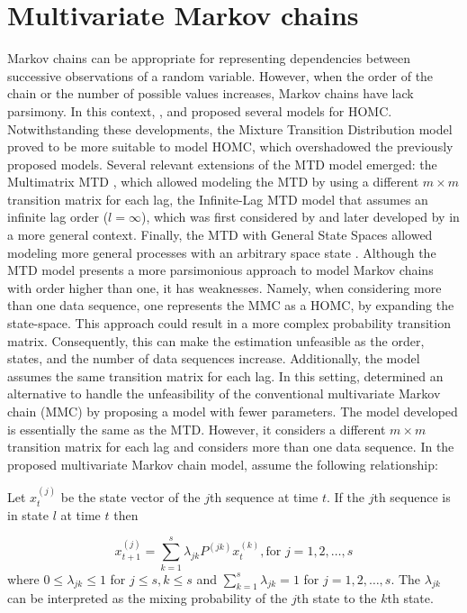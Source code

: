 \section{Multivariate Markov chains}\label{multivariate-markov-chains}

Markov chains can be appropriate for representing dependencies between successive observations of a random variable. However, when the order of the chain or the number of possible values increases, Markov chains have lack parsimony. In this context, \citet{JacobLewis1978}, \citet{Pegram1980} and \citet{Logan1981} proposed several models for HOMC. Notwithstanding these developments, the Mixture Transition Distribution model \citep{Raftery1985} proved to be more suitable to model HOMC, which overshadowed the previously proposed models. Several relevant extensions of the MTD model emerged: the Multimatrix MTD \citep{Berchtold1995, Berchtold1996}, which allowed modeling the MTD by using a different \(m \times m\) transition matrix for each lag, the Infinite-Lag MTD model that assumes an infinite lag order (\(l = \infty\)), which was first considered by \citet{Mehran1989} and later developed by \citet{Le1996} in a more general context. Finally, the MTD with General State Spaces allowed modeling more general processes with an arbitrary space state \citep{Martin1987, Adke1988, Wong2001}. Although the MTD model presents a more parsimonious approach to model Markov chains with order higher than one, it has weaknesses. Namely, when considering more than one data sequence, one represents the MMC as a HOMC, by expanding the state-space. This approach could result in a more complex probability transition matrix. Consequently, this can make the estimation unfeasible as the order, states, and the number of data sequences increase. Additionally, the model assumes the same transition matrix for each lag. In this setting, \citet{Ching2002} determined an alternative to handle the unfeasibility of the conventional multivariate Markov chain (MMC) by proposing a model with fewer parameters. The model developed is essentially the same as the MTD. However, it considers a different \(m \times m\) transition matrix for each lag and considers more than one data sequence. In the proposed multivariate Markov chain model, \citet{Ching2002} assume the following relationship:

Let \(x_t^{(j)}\) be the state vector of the \(j\)th sequence at time \(t\). If the \(j\)th sequence is in state \(l\) at time \(t\) then

\begin{equation}
x_{t+1}^{(j)} = \sum_{k=1}^s \lambda_{jk}P^{(jk)}x_{t}^{(k)}, \text{for } j =1, 2, \dots, s
\label{eq:eq1}
\end{equation}
where \(0 \leq \lambda_{jk} \leq 1\) for \(j \leq s, k \leq s\) and \(\sum_{k=1}^s \lambda_{jk} =1\) for \(j=1, 2, \dots, s\). The \(\lambda_{jk}\) can be interpreted as the mixing probability of the \(j\)th state to the \(k\)th state.

